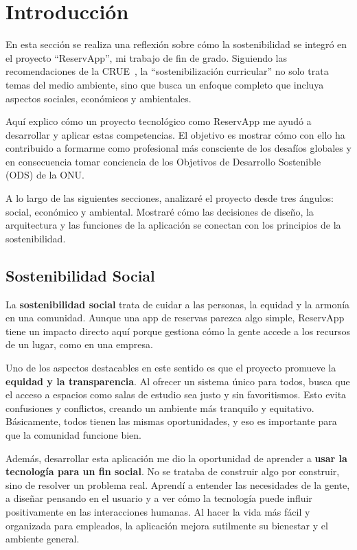 
\section{Introducción}
En esta sección se realiza una reflexión sobre cómo la sostenibilidad se integró en el proyecto ``ReservApp'', mi trabajo de fin de grado. Siguiendo las recomendaciones de la CRUE~\cite{crue}, la ``sostenibilización curricular'' no solo trata temas del medio ambiente, sino que busca un enfoque completo que incluya aspectos sociales, económicos y ambientales.

Aquí explico cómo un proyecto tecnológico como ReservApp me ayudó a desarrollar y aplicar estas competencias. El objetivo es mostrar cómo con ello ha contribuido a formarme como profesional más consciente de los desafíos globales y en consecuencia tomar conciencia de los Objetivos de Desarrollo Sostenible (ODS) de la ONU.

A lo largo de las siguientes secciones, analizaré el proyecto desde tres ángulos: social, económico y ambiental. Mostraré cómo las decisiones de diseño, la arquitectura y las funciones de la aplicación se conectan con los principios de la sostenibilidad.

\subsection{Sostenibilidad Social}
La \textbf{sostenibilidad social} trata de cuidar a las personas, la equidad y la armonía en una comunidad. Aunque una app de reservas parezca algo simple, ReservApp tiene un impacto directo aquí porque gestiona cómo la gente accede a los recursos de un lugar, como en una empresa.

Uno de los aspectos destacables en este sentido es que el proyecto promueve la \textbf{equidad y la transparencia}. Al ofrecer un sistema único para todos, busca que el acceso a espacios como salas de estudio sea justo y sin favoritismos. Esto evita confusiones y conflictos, creando un ambiente más tranquilo y equitativo. Básicamente, todos tienen las mismas oportunidades, y eso es importante para que la comunidad funcione bien.

Además, desarrollar esta aplicación me dio la oportunidad de aprender a \textbf{usar la tecnología para un fin social}. No se trataba de construir algo por construir, sino de resolver un problema real. Aprendí a entender las necesidades de la gente, a diseñar pensando en el usuario y a ver cómo la tecnología puede influir positivamente en las interacciones humanas. Al hacer la vida más fácil y organizada para empleados, la aplicación mejora sutilmente su bienestar y el ambiente general.

